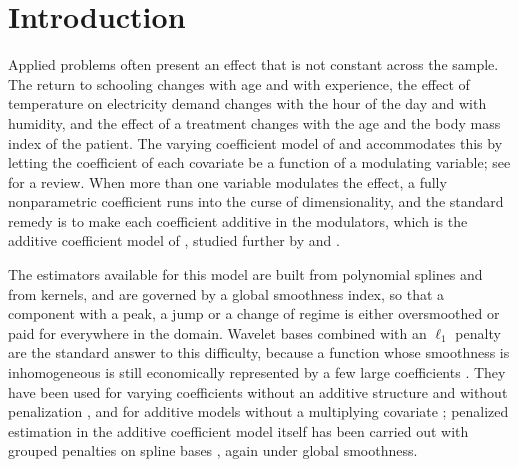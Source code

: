 \section{Introduction}
\label{sec:intro}

Applied problems often present an effect that is not constant across the
sample. The return to schooling changes with age and with experience, the
effect of temperature on electricity demand changes with the hour of the day
and with humidity, and the effect of a treatment changes with the age and the
body mass index of the patient. The varying coefficient model of
\citet{Hastie-Tibshirani-1993} and \citet*{Cai-Fan-Yao-2000} accommodates this
by letting the coefficient of each covariate be a function of a modulating
variable; see \citet{Fan-Zhang-2008} for a review. When more than one variable
modulates the effect, a fully nonparametric coefficient runs into the curse of
dimensionality, and the standard remedy is to make each coefficient additive
in the modulators, which is the additive coefficient model of
\citet{Xue-Yang-2006}, studied further by \citet{Xue-Liang-2010} and
\citet{Liu-Yang-2010}.

The estimators available for this model are built from polynomial splines and
from kernels, and are governed by a global smoothness index, so that a
component with a peak, a jump or a change of regime is either oversmoothed or
paid for everywhere in the domain. Wavelet bases combined with an $\ell_1$
penalty \citep{tibshirani1996regression} are the standard answer to this difficulty, because a function whose
smoothness is inhomogeneous is still economically represented by a few large
coefficients \citep{Donoho-Johnstone-1994, Donoho-Johnstone-1998,
Antoniadis-Fan-2001}. They have been used for varying coefficients without an
additive structure and without penalization \citep*{Zhou-You-2004,
Montoril-Morettin-Chiann-2018}, and for additive models without a multiplying
covariate \citep{Sardy-Tseng-2004, Zhang-Wong-2003, Haris-Simon-Shojaie-2018,
Amato-Antoniadis-DeFeis-Gijbels-2022, Sardy-Ma-2024}; penalized estimation in
the additive coefficient model itself has been carried out with grouped
penalties on spline bases \citep{Wei-Huang-Li-2011,
Antoniadis-Gijbels-LambertLacroix-2014, Ma-Carroll-Liang-Xu-2015}, again under
global smoothness.

